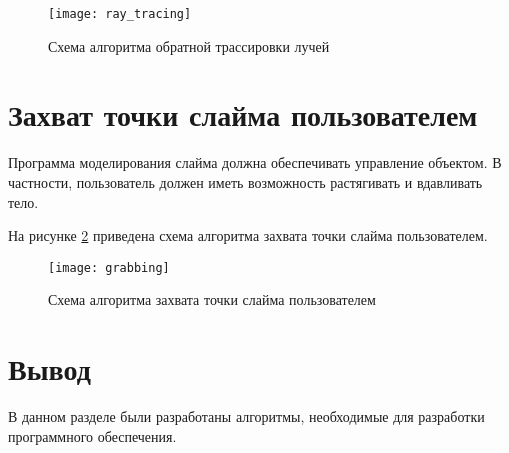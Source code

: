 \begin{figure}[H]
	\centering
	\texttt{[image: ray\_tracing]}
	\caption{Схема алгоритма обратной трассировки лучей}
	\label{ray_tracing}
\end{figure}

\section{Захват точки слайма пользователем}

Программа моделирования слайма должна обеспечивать управление объектом. В частности, пользователь должен иметь возможность растягивать и вдавливать тело.

На рисунке \ref{grabbing} приведена схема алгоритма захвата точки слайма пользователем.

\begin{figure}[H]
	\centering
	\texttt{[image: grabbing]}
	\caption{Схема алгоритма захвата точки слайма пользователем}
	\label{grabbing}
\end{figure}

\section*{Вывод}
В данном разделе были разработаны алгоритмы, необходимые для разработки программного обеспечения.

\clearpage
